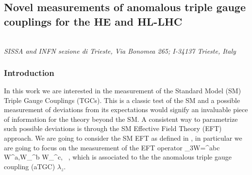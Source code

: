\documentclass[../report.tex]{subfiles}
\begin{document}
{}






\subsection{Novel measurements of anomalous triple gauge couplings for the HE and HL-LHC} 
\begin{center}
\bigskip\vspace{1cm}{A. Azatov, D. Barducci, J. Elias-Mir\'o and Elena Venturini}
\\[7mm]
 {\it \small
SISSA and INFN sezione di Trieste, Via Bonomea 265; I-34137 Trieste, Italy\\
 }
\end{center}

\subsubsection{Introduction}
\label{intro}


In this work we are interested in the measurement of the Standard Model (SM) Triple Gauge Couplings (TGCs). This is a classic test of the SM and a possible measurement of deviations from its expectations would signify an invaluable piece of information for the theory beyond the SM. A consistent way to parametrize such possible deviations is through the SM Effective Field Theory (EFT) approach.
We are going to consider the SM EFT as defined in \cite{Azatov:2017kzw}, in particular we are going to focus on the measurement of the EFT operator 
\be
{}_{3W}=\epsilon^{abc} W^{a,\mu\nu}W_{\nu\rho}^b W_{\mu}^{c,\rho} \, , 
\ee
  which is associated to the the anomalous triple gauge coupling (aTGC) $\lambda_z$.
\end{document}
